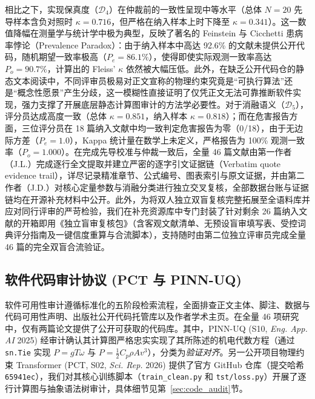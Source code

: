 相比之下，实现保真度（$\mathcal{D}_4$）在仲裁前的一致性呈现中等水平（总体 $N=20$ 先导样本含负对照时 $\kappa = 0.716$，但严格在纳入样本上时下降至 $\kappa = 0.341$）。这一数值降幅在测量学与统计学中极为典型，反映了著名的 Feinstein 与 Cicchetti 患病率悖论（Prevalence Paradox）：由于纳入样本中高达 92.6\% 的文献未提供公开代码，随机期望一致率极高（$P_e = 86.1\%$），使得即使实际观测一致率高达 $P_o = 90.7\%$，计算出的 Fleiss' $\kappa$ 依然被大幅压低。此外，在缺乏公开代码仓的静态文本阅读中，不同评审员极易对正文宣称的物理约束究竟是“可执行算法”还是“概念性愿景”产生分歧，这一模糊性直接证明了仅凭正文无法可靠推断软件实现，强力支撑了开展底层静态计算图审计的方法学必要性。对于消融语义（$\mathcal{D}_5$），评分员达成高度一致（总体 $\kappa = 0.851$，纳入样本 $\kappa = 0.818$）；而在危害报告方面，三位评分员在 18 篇纳入文献中均一致判定危害报告为零（0/18），由于无边际方差（$P_e = 1.0$），Kappa 统计量在数学上未定义，严格报告为 100\% 观测一致率（$P_o = 1.000$）。在完成先导校准与仲裁一致后，全量 46 篇文献由第一作者（J.L.）完成逐行全文提取并建立严密的逐字引文证据链（Verbatim quote evidence trail），详尽记录精准章节、公式编号、图表索引与原文证据，并由第二作者（J.D.）对核心定量参数与消融分类进行独立交叉复核，全部数据台账与证据链均在开源补充材料中公开。此外，为将双人独立双盲复核完整拓展至全语料库并应对同行评审的严苛检验，我们在补充资源库中专门封装了针对剩余 26 篇纳入文献的开箱即用《独立盲审复核包》（含客观文献清单、无预设盲审填写表、受控词典评分指南及一键信度重算与合流脚本），支持随时由第二位独立评审员完成全量 46 篇的完全双盲合流验证。

\subsection{软件代码审计协议 (PCT 与 PINN-UQ)}
软件可用性审计遵循标准化的五阶段检索流程，全面排查正文主体、脚注、数据与代码可用性声明、出版社公开代码托管库以及作者学术主页。在全量 46 项研究中，仅有两篇论文提供了公开可获取的代码库。其中，PINN-UQ (S10, \textit{Eng. App. AI} 2025) 经审计确认其计算图严格忠实实现了其所陈述的机电代数方程（通过 \texttt{sn.Tie} 实现 $P = g T \omega$ 与 $P = \frac{1}{2} C_p \rho A v^3$），分类为\textit{验证对齐}。另一公开项目物理约束 Transformer (PCT, S02, \textit{Sci. Rep.} 2026) 提供了官方 GitHub 仓库（提交哈希 \texttt{65941ec}），我们对其核心训练脚本（\texttt{train\_clean.py} 和 \texttt{tst/loss.py}）开展了逐行计算图与抽象语法树审计，具体细节见第~\ref{sec:code_audit}节。

